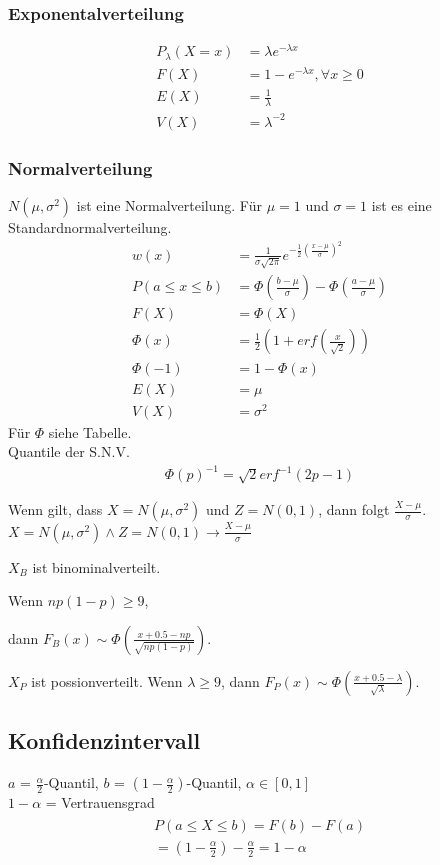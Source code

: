 \documentclass[a4paper, 8pt, landscape]{extarticle}
\begin{document}
\begin{multicols*}{5}
			\subsubsection{Exponentalverteilung}
				\begin{align*}
					P_\lambda(X=x) &= \lambda e^{-\lambda x}\\
					F(X)&=1-e^{-\lambda x}, \forall x\geq 0\\
					E(X)&=\frac{1}{\lambda}\\
					V(X)&=\lambda^{-2}
				\end{align*}
	    	\subsubsection{Normalverteilung}
		    	$N(\mu, \sigma^2)$ ist eine Normalverteilung. Für $\mu = 1$ und $\sigma = 1$ ist es eine Standardnormalverteilung.
		    	\begin{align*}
		    		w(x) &= \frac{1}{\sigma \sqrt{2 \pi}} e^{-\frac{1}{2}(\frac{x-\mu}{\sigma})^2}\\
		    		P(a\le x\le b)&= \Phi(\frac{b-\mu}{\sigma})-\Phi(\frac{a-\mu}{\sigma})\\
		    		F(X)&=\Phi(X)\\
		    		\Phi(x)&=\frac{1}{2}(1+erf(\frac{x}{\sqrt2}))\\
		    		\Phi(-1)&=1-\Phi(x)\\
		    		E(X)&=\mu\\
		    		V(X)&=\sigma^2
		    	\end{align*}
		    	Für $\Phi$ siehe Tabelle.\\
		  		Quantile der S.N.V.
		  		\begin{align*}
		  			\Phi(p)^{-1}=\sqrt2erf^{-1}(2p-1)
	  			\end{align*}
	  			
		    	Wenn gilt, dass $X = N(\mu, \sigma^2)$ und $Z = N(0,1)$, dann folgt $\frac{X - \mu}{\sigma}$. \\
		    	$X = N(\mu, \sigma^2)\land Z = N(0,1)\rightarrow \frac{X - \mu}{\sigma}$\medskip
		    	
		    	$X_B$ ist binominalverteilt.\par
		    	Wenn $np(1-p)\ge9$,\par dann $F_B(x) \sim \Phi\left(\frac{x + 0.5 - np}{\sqrt{np(1-p)}}\right)$.\medskip
		    	
		    	$X_P$ ist possionverteilt. Wenn $\lambda \ge 9$, dann $F_P(x) \sim \Phi\left(\frac{x + 0.5 - \lambda}{\sqrt{\lambda}}\right)$.
	    	\subsection{Konfidenzintervall}
	    		$a$ = $\frac{\alpha}{2}$-Quantil, $b$ = $(1-\frac{\alpha}{2})$-Quantil, $\alpha\in [0,1]$\\
	    		$1-\alpha$ = Vertrauensgrad
	    		\begin{align*}
		    		\begin{split}
		    		P(a\leq X\leq b)=F(b)-F(a)\\
		    			=(1-\frac{\alpha}{2})-\frac{\alpha}{2}=1-\alpha
		    		\end{split}
	    		\end{align*}

\end{multicols*}
\end{document}

